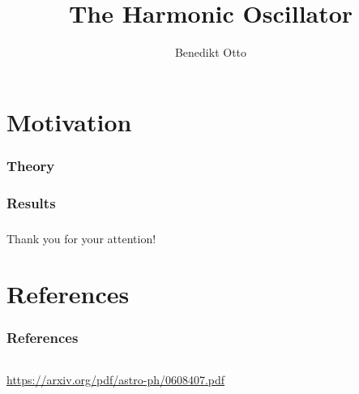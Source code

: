 \documentclass[aspectratio=169]{beamer}
\title[Xenon1T]{The Harmonic Oscillator}
\author{Benedikt Otto}
\date{\printdate{24.03.2020}} %
\institute{Computational Physics}
\begin{document}
\begin{frame}
	\titlepage
\end{frame}


\section{Motivation}
\begin{frame}

\end{frame}

\begin{frame}
\frametitle{Theory}

\end{frame}

\begin{frame}
\frametitle{Results}

\end{frame}


\begin{frame}
\frametitle{}
\begin{center}
	Thank you for your attention!
\end{center}
\end{frame}

\section{References}
\begin{frame}
\frametitle{References}
\vspace{-20px}
\begin{columns}[T]
	\begin{column}{0.35\textwidth}
		\begin{tiny}
			\begin{thebibliography}{99}
				\fontsize{6}{6}
				\url{https://arxiv.org/pdf/astro-ph/0608407.pdf}
			\end{thebibliography}
		\end{tiny}
	\end{column}
\end{columns}
\end{frame}



\appendixstyle

\appendix
\end{document}
